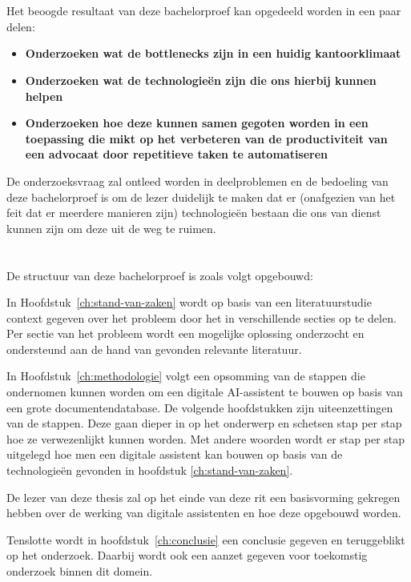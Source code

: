 \section{}%
\label{sec:onderzoeksdoelstelling}
Het beoogde resultaat van deze bachelorproef kan opgedeeld worden in een paar delen:
\begin{itemize}
	\item \textbf{Onderzoeken wat de bottlenecks zijn in een huidig kantoorklimaat}
	\item \textbf{Onderzoeken wat de technologieën zijn die ons hierbij kunnen helpen}
	\item \textbf{Onderzoeken hoe deze kunnen samen gegoten worden in een toepassing die mikt op het verbeteren van de productiviteit van een advocaat door repetitieve taken te automatiseren}
\end{itemize}

De onderzoeksvraag zal ontleed worden in deelproblemen en de bedoeling van deze bachelorproef is om de lezer duidelijk te maken dat er (onafgezien van het feit dat er meerdere manieren zijn)
technologieën bestaan die ons van dienst kunnen zijn om deze uit de weg te ruimen. 

\section{}%
\label{sec:opzet-bachelorproef}


De structuur van deze bachelorproef is zoals volgt opgebouwd:

In Hoofdstuk~\ref{ch:stand-van-zaken} wordt op basis van een literatuurstudie context gegeven over het probleem door het in verschillende secties op te delen. 
Per sectie van het probleem wordt een mogelijke oplossing onderzocht en ondersteund aan de hand van gevonden relevante literatuur. 

In Hoofdstuk~\ref{ch:methodologie} volgt een opsomming van de stappen die ondernomen kunnen worden om een digitale AI-assistent te bouwen op basis van een grote documentendatabase. 
De volgende hoofdstukken zijn uiteenzettingen van de stappen. 
Deze gaan dieper in op het onderwerp en schetsen stap per stap hoe ze verwezenlijkt kunnen worden. 
Met andere woorden wordt er stap per stap uitgelegd hoe men een digitale assistent kan bouwen op basis van de technologieën gevonden in hoofdstuk \ref{ch:stand-van-zaken}.

De lezer van deze thesis zal op het einde van deze rit een basisvorming gekregen hebben over de werking van digitale assistenten en hoe deze opgebouwd worden. 

Tenslotte wordt in hoofdstuk~\ref{ch:conclusie} een conclusie gegeven en teruggeblikt op het onderzoek. 
Daarbij wordt ook een aanzet gegeven voor toekomstig onderzoek binnen dit domein.
